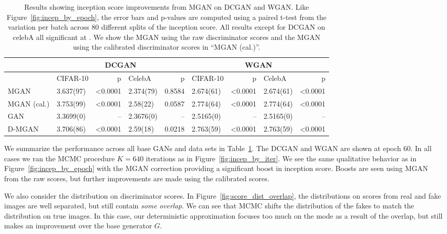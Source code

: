 \documentclass{article}
\begin{document}
\begin{table}[htbp]
\centering
    \caption{{\small
    Results showing inception score improvements from MGAN on DCGAN and WGAN\@.
    Like Figure~\ref{fig:incep_by_epoch}, the error bars and p-values are computed using a paired t-test from the variation per batch across 80 different splits of the inception score.
    All results except for DCGAN on celebA all significant at .
    We show the MGAN using the raw discriminator scores and the MGAN using the calibrated discriminator scores in ``MGAN (cal.)''.
    }}
    \label{tbl:inception}
{\scriptsize
\begin{tabular}{|l|l|r|l|r||l|r|l|r|}
\toprule
~                 & \multicolumn{4}{c}{DCGAN}                               & \multicolumn{4}{c}{WGAN} \\
\toprule
~                 & CIFAR-10         &      p   & CelebA         &      p   & CIFAR-10        &      p   & CelebA        &      p \\
\midrule
MGAN              &        3.637(97) &  <0.0001 &      2.374(79) &  0.8584  &       2.674(61) &  <0.0001 &     2.674(61) &  <0.0001 \\
MGAN (cal.)       &        3.753(99) &  <0.0001 &      2.58(22)  &  0.0587  &       2.774(64) &  <0.0001 &     2.774(64) &  <0.0001 \\
GAN               &        3.3699(0) &       -- &      2.3676(0) &      --  &       2.5165(0) &       -- &     2.5165(0) &       -- \\
D-MGAN            &        3.706(86) &  <0.0001 &      2.59(18)  &  0.0218  &       2.763(59) &  <0.0001 &     2.763(59) &  <0.0001 \\
\bottomrule
\end{tabular}
}
\end{table}

We summarize the performance across all base GANs and data sets in Table~\ref{tbl:inception}.
The DCGAN and WGAN are shown at epoch 60.
In all cases we ran the MCMC procedure $K=640$ iterations as in Figure~\ref{fig:incep_by_iter}.
We see the same qualitative behavior as in Figure~\ref{fig:incep_by_epoch} with the MGAN correction providing a significant boost in inception score.
Boosts are seen using MGAN from the raw scores, but further improvements are made using the calibrated scores.

We also consider the distribution on discriminator scores.
In Figure~\ref{fig:score_dist_overlap}, the distributions on scores from real and fake images are well separated, but still contain \emph{some overlap}.
We can see that MCMC shifts the distribution of the fakes to match the distribution on true images.
In this case, our deterministic approximation focuses too much on the mode as a result of the overlap, but still makes an improvement over the base generator $G$.
\end{document}
